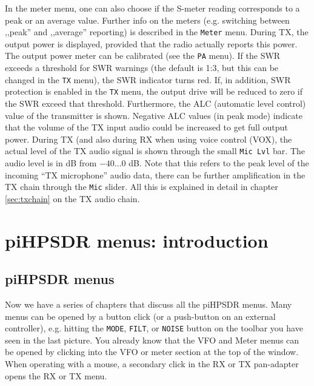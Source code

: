 \documentclass[12pt]{book}
\def\rett#1{\texttt{\color{red}#1}}
\def\bltt#1{\texttt{\color{blue}#1}}
\def\pH{pi\-HPSDR\xspace}
\begin{document}
 In the
meter menu, one can also choose if the S-meter reading corresponds to a peak
or  an average value. Further info on the meters (e.g. switching between
,,peak'' and ,,average'' reporting)
is described in the \bltt{Meter} menu.
During TX, the output power is displayed, provided that the radio actually
reports this power. The output power meter can be calibrated (see the \bltt{PA}
menu). If the SWR exceeds a threshold for SWR warnings (the default is 1:3, but
this can be changed in the \bltt{TX} menu), the SWR indicator turns red. If,
in addition, SWR protection is enabled in the \bltt{TX} menu, the output
drive  will be reduced to zero if the SWR exceed that threshold.
Furthermore, the ALC (automatic level control) value of the transmitter is
shown. Negative ALC values (in peak mode) indicate that the volume of the TX input audio
could be increased to get full output  power. During TX (and also during RX when using
voice control (VOX), the actual level of the TX audio  signal is shown through
the small \rett{Mic Lvl} bar. The audio level is in dB from $-40\ldots0$ dB. Note that
this refers to the peak level of the  incoming ``TX microphone'' audio data, there can
be further amplification in the TX  chain through the \bltt{Mic} slider. All this
is explained in detail in chapter \ref{sec:txchain} on the TX audio chain.



\chapter{\pH menus: introduction}

\section{\pH menus}
Now we have a series of chapters that discuss all the \pH menus. Many menus can be
opened by a button click (or a push-button on an external controller), e.g. hitting the
\rett{MODE}, \rett{FILT}, or \rett{NOISE} button on the
toolbar you have seen in the last picture. You already know that the VFO and Meter
menus can be opened by clicking into the VFO or meter section at the top of the window.
When operating with a mouse, a secondary click in the RX or TX pan-adapter opens the
RX or TX menu.
\end{document}
